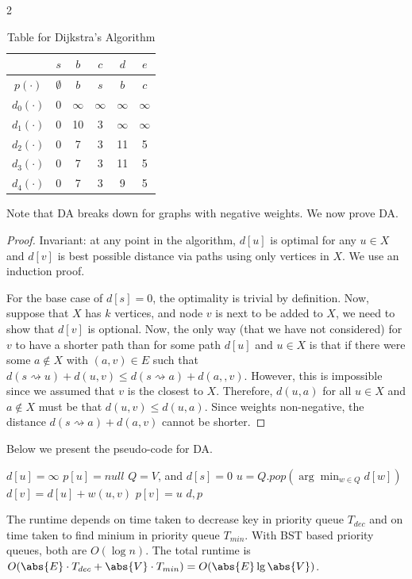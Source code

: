 \begin{multicols}{2}
\bigskip
\begin{table}[H]
    \centering
    \begin{tabular}{c|c c c c c}
     & $s$ & $b$ & $c$ & $d$ & $e$ \\
     \hline\hline
     $p(\cdot)$ & $\emptyset$ & $b$ & $s$ & $b$ & $c$ \\
     $d_0(\cdot)$ & 0 & $\infty$ & $\infty$ & $\infty$ & $\infty$ \\
     $d_1(\cdot)$ & 0 & 10 & 3 & $\infty$ & $\infty$ \\
     $d_2(\cdot)$ & 0 & 7 & 3 & 11 & 5 \\
     $d_3(\cdot)$ & 0 & 7 & 3 & 11 & 5 \\
     $d_4(\cdot)$ & 0 & 7 & 3 & 9 & 5
    \end{tabular}
    \caption{Table for Dijkstra's Algorithm}
\end{table}
Note that DA breaks down for graphs with negative weights. We now prove DA. 
\begin{proof}
    Invariant: at any point in the algorithm, $d[u]$ is optimal for any $u \in X$ and $d[v]$ is best possible distance via paths using only vertices in $X$. We use an induction proof. 

    For the base case of $d[s] = 0$, the optimality is trivial by definition. Now, suppose that $X$ has $k$ vertices, and node $v$ is next to be added to $X$, we need to show that $d[v]$ is optional. Now, the only way (that we have not considered) for $v$ to have a shorter path than for some path $d[u]$ and $u \in X$ is that if there were some $a\notin X$ with $(a,v) \in E$ such that $d(s\rightsquigarrow u) + d(u, v) \leq d(s \rightsquigarrow a) + d(a,,v)$. However, this is impossible since we assumed that $v$ is the closest to $X$. Therefore, $d(u, a)$ for all $u \in X$ and $a\notin X$ must be that $d(u, v) \leq d(u, a)$. Since weights non-negative, the distance $d(s\rightsquigarrow a) + d(a, v)$ cannot be shorter. 
\end{proof}

Below we present the pseudo-code for DA. 
\bigskip
\begin{algorithm}[H]
    \caption{Dijkstra$(V, E, w, s)$}
    \begin{algorithmic}[1]
            \State $d[u] = \infty$
            \State $p[u] = null$
        \EndFor
        \State $Q = V$, and $d[s] = 0$
            \State $u = Q.pop(\arg\min_{w \in Q} d[w])$
                    \State $d[v] = d[u] + w(u,v)$
                    \State $p[v] = u$
                \EndIf
            \EndFor
        \EndWhile
        \State \Return $d,p$
    \end{algorithmic}
\end{algorithm}
The runtime depends on time taken to decrease key in priority queue $T_{dec}$ and on time taken to find minium in priority queue $T_{min}$. With BST based priority queues, both are $O(\log n)$. The total runtime is $O(\abs{E}\cdot T_{dec} + \abs{V} \cdot T_{min}) = O(\abs{E}\lg \abs{V})$. 


\end{multicols}
